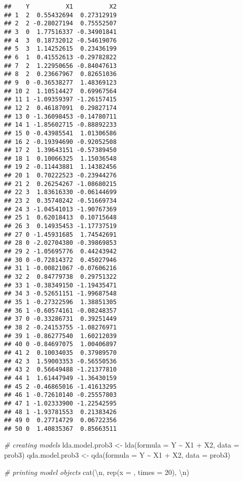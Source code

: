 \documentclass[
]{article}
\newenvironment{Shaded}{\begin{snugshade}}{\end{snugshade}}
\newcommand{\AttributeTok}[1]{\textcolor[rgb]{0.77,0.63,0.00}{#1}}
\newcommand{\CommentTok}[1]{\textcolor[rgb]{0.56,0.35,0.01}{\textit{#1}}}
\newcommand{\DecValTok}[1]{\textcolor[rgb]{0.00,0.00,0.81}{#1}}
\newcommand{\FunctionTok}[1]{\textcolor[rgb]{0.00,0.00,0.00}{#1}}
\newcommand{\NormalTok}[1]{#1}
\newcommand{\OtherTok}[1]{\textcolor[rgb]{0.56,0.35,0.01}{#1}}
\newcommand{\SpecialCharTok}[1]{\textcolor[rgb]{0.00,0.00,0.00}{#1}}
\newcommand{\StringTok}[1]{\textcolor[rgb]{0.31,0.60,0.02}{#1}}
\begin{document}
\begin{verbatim}
##    Y          X1          X2
## 1  2  0.55432694  0.27312919
## 2  2 -0.28027194  0.75552507
## 3  0  1.77516337 -0.34901841
## 4  3  0.18732012 -0.54619076
## 5  3  1.14252615  0.23436199
## 6  1  0.41552613 -0.29782822
## 7  2  1.22950656 -0.84047613
## 8  2  0.23667967  0.82651036
## 9  0 -0.36538277  1.48369123
## 10 2  1.10514427  0.69967564
## 11 1 -1.09359397 -1.26157415
## 12 2  0.46187091  0.29827174
## 13 0 -1.36098453 -0.14780711
## 14 1 -1.85602715 -0.88892233
## 15 0 -0.43985541  1.01306586
## 16 2 -0.19394690 -0.92052508
## 17 2  1.39643151 -0.57389450
## 18 1  0.10066325  1.15036548
## 19 2 -0.11443881  1.14382456
## 20 1  0.70222523 -0.23944276
## 21 2  0.26254267 -1.08680215
## 22 3  1.83616330 -0.06144699
## 23 2  0.35740242 -0.51669734
## 24 3 -1.04541013 -1.90767369
## 25 1  0.62018413  0.10715648
## 26 3  0.14935453 -1.17737519
## 27 0 -1.45931685  1.74542691
## 28 0 -2.02704380 -0.39869853
## 29 2 -1.05695776  0.44243942
## 30 0 -0.72814372  0.45027946
## 31 1 -0.00821067 -0.07606216
## 32 2  0.84779738  0.29751322
## 33 1 -0.38349150 -1.19435471
## 34 3 -0.52651151 -1.99687548
## 35 1 -0.27322596  1.38851305
## 36 1 -0.60574161 -0.08248357
## 37 0 -0.33286731  0.39251449
## 38 2 -0.24153755 -1.08276971
## 39 1 -0.86277540  1.60212039
## 40 0 -0.84697075  1.00406897
## 41 2  0.10034035  0.37989570
## 42 3  1.59003353 -0.56550536
## 43 2  0.56649488 -1.21377810
## 44 1  1.61447949 -1.36430159
## 45 2 -0.46865016 -1.41613295
## 46 1 -0.72610140 -0.25557803
## 47 1 -1.02333900 -1.22542595
## 48 1 -1.93781553  0.21383426
## 49 0  0.27714729  0.06722356
## 50 0  1.40835367  0.85663511
\end{verbatim}

\begin{Shaded}
\begin{Highlighting}[]
\CommentTok{\# creating models}
\NormalTok{lda.model.prob3 }\OtherTok{\textless{}{-}} \FunctionTok{lda}\NormalTok{(}\AttributeTok{formula =}\NormalTok{ Y }\SpecialCharTok{\textasciitilde{}}\NormalTok{ X1 }\SpecialCharTok{+}\NormalTok{ X2, }\AttributeTok{data =}\NormalTok{ prob3)}
\NormalTok{qda.model.prob3 }\OtherTok{\textless{}{-}} \FunctionTok{qda}\NormalTok{(}\AttributeTok{formula =}\NormalTok{ Y }\SpecialCharTok{\textasciitilde{}}\NormalTok{ X1 }\SpecialCharTok{+}\NormalTok{ X2, }\AttributeTok{data =}\NormalTok{ prob3)}

\CommentTok{\# printing model objects}
\FunctionTok{cat}\NormalTok{(}\StringTok{\textquotesingle{}}\SpecialCharTok{\textbackslash{}n}\StringTok{\textquotesingle{}}\NormalTok{, }\FunctionTok{rep}\NormalTok{(}\AttributeTok{x =} \StringTok{\textquotesingle{}{-}\textquotesingle{}}\NormalTok{, }\AttributeTok{times =} \DecValTok{20}\NormalTok{), }\StringTok{\textquotesingle{}}\SpecialCharTok{\textbackslash{}n}\StringTok{\textquotesingle{}}\NormalTok{)}
\end{Highlighting}
\end{Shaded}
\end{document}
